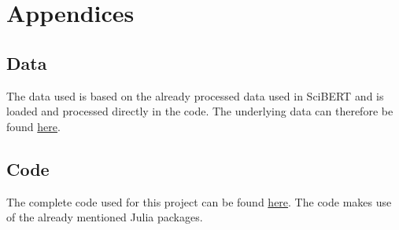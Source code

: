 \appendix
\chapter*{Appendices}
\renewcommand\thesection{\Alph{section}}
\section{Data}
The data used is based on the already processed data used in SciBERT \cite{Beltagy2019} and is loaded and processed directly in the code. The underlying data can therefore be found \href{https://github.com/allenai/scibert}{here}.
\section{Code}
The complete code used for this project can be found \href{https://github.com/JanNiklasWeder/reproducibility-scibert}{here}. The code makes use of the already mentioned Julia packages.